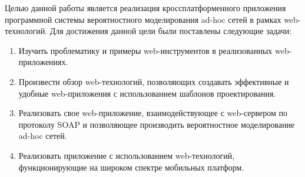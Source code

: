 Целью данной работы является реализация кроссплатформенного приложения программной системы вероятностного моделирования ad-hoc сетей в рамках web-технологий. Для достижения данной цели были поставлены следующие задачи:
\begin{enumerate}
 \item Изучить проблематику и примеры web-инструментов в реализованных web-приложениях.
 \item Произвести обзор web-технологий, позволяющих создавать эффективные и удобные web-приложения с использованием шаблонов проектирования.
 \item Реализовать свое web-приложение, взаимодействующее с web-сервером по протоколу SOAP и позволяющее производить вероятностное моделирование ad-hoc сетей.
 \item Реализовать приложение с использованием web-технологий, функционирующие на широком спектре мобильных платформ.
\end{enumerate}

\clearpage